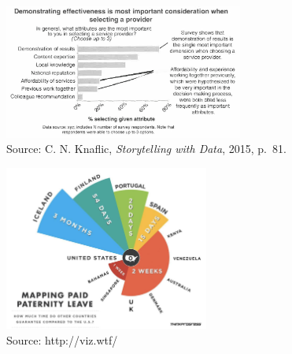 \documentclass[
  letterpaper,
  DIV=11,
  numbers=noendperiod]{scrreprt}
\begin{document}
\hfill\break
\hfill\break
\hfill\break

\begin{figure}[H]

{\centering \includegraphics[width=0.7\textwidth,height=\textheight]{src/../images/clutter.png}

}

\caption{Source: C. N. Knaflic, \emph{Storytelling with Data}, 2015,
p.~81.}

\end{figure}%

\hfill\break
\hfill\break
\hfill\break

\begin{figure}[H]

{\centering \includegraphics[width=0.6\textwidth,height=\textheight]{src/../images/badviz4.png}

}

\caption{Source: http://viz.wtf/}

\end{figure}%

\hfill\break
\hfill\break
\hfill\break
\end{document}
